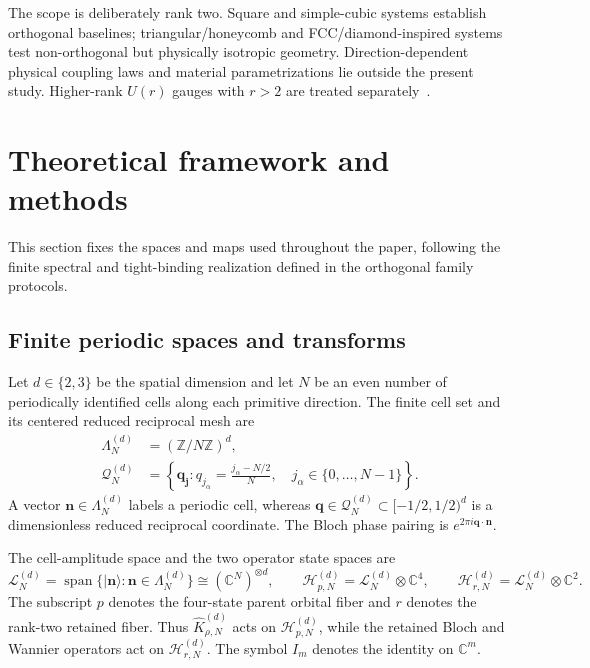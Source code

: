 \documentclass[11pt]{article}
\newcommand{\C}{\mathbb C}
\begin{document}
The scope is deliberately rank two. Square and simple-cubic systems establish
orthogonal baselines; triangular/honeycomb and FCC/diamond-inspired systems test
non-orthogonal but physically isotropic geometry. Direction-dependent physical coupling
laws and material parametrizations lie outside the present study. Higher-rank $U(r)$
gauges with $r>2$ are treated separately~\cite{Ragasa2026c}.

\section{Theoretical framework and methods}

This section fixes the spaces and maps used throughout the paper, following the finite
spectral and tight-binding realization defined in the orthogonal family protocols.

\subsection{Finite periodic spaces and transforms}

Let $d\in\{2,3\}$ be the spatial dimension and let $N$ be an even number of periodically
identified cells along each primitive direction. The finite cell set and its centered
reduced reciprocal mesh are
\begin{align}
 \Lambda_N^{(d)}&=(\mathbb Z/N\mathbb Z)^d,\\
 \mathcal Q_N^{(d)}
 &=\left\{\mathbf q_{\mathbf j}:q_{j_\alpha}
   =\frac{j_\alpha-N/2}{N},\quad
   j_\alpha\in\{0,\ldots,N-1\}\right\}.
 \label{eq:finite-cell-and-mesh}
\end{align}
A vector $\mathbf n\in\Lambda_N^{(d)}$ labels a periodic cell, whereas
$\mathbf q\in\mathcal Q_N^{(d)}\subset[-1/2,1/2)^d$ is a dimensionless reduced
reciprocal coordinate. The Bloch phase pairing is
$e^{2\pi i\mathbf q\cdot\mathbf n}$.

The cell-amplitude space and the two operator state spaces are
\begin{equation}
 \mathcal L_N^{(d)}
 =\operatorname{span}\{\lvert\mathbf n\rangle:\mathbf n\in\Lambda_N^{(d)}\}
 \cong(\C^N)^{\otimes d},\qquad
 \mathcal H_{p,N}^{(d)}=\mathcal L_N^{(d)}\otimes\C^4,
 \qquad
 \mathcal H_{r,N}^{(d)}=\mathcal L_N^{(d)}\otimes\C^2.
 \label{eq:spaces}
\end{equation}
The subscript $p$ denotes the four-state parent orbital fiber and $r$ denotes the
rank-two retained fiber. Thus $\widehat K_{\rho,N}^{(d)}$ acts on
$\mathcal H_{p,N}^{(d)}$, while the retained Bloch and Wannier operators act on
$\mathcal H_{r,N}^{(d)}$. The symbol $I_m$ denotes the identity on $\C^m$.
\end{document}
